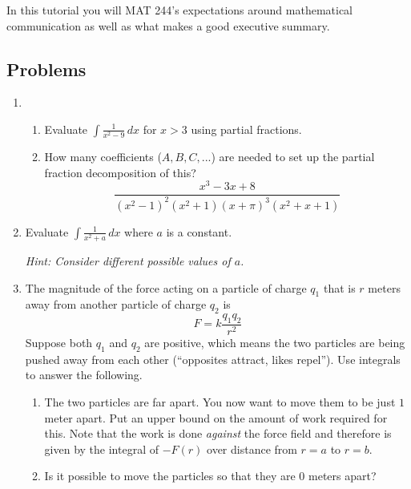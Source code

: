 \begin{objectives}
	In this tutorial you will MAT 244's expectations around mathematical communication as well
	as what makes a good executive summary.
\end{objectives}

\vspace{-.5em}
\subsection*{Problems}
\vspace{-.5em}


\begin{enumerate}
	\item 
	
\begin{enumerate}
    \item Evaluate $\int \frac{1}{x^2 - 9}\,dx$ for $x > 3$ using partial fractions.
    \item How many coefficients ($A,B,C,...$) are needed to set up the partial fraction decomposition of this?
	\[
		\frac{x^3-3x+8}{(x^2-1)^2(x^2+1)(x+\pi)^3(x^2+x+1)}
	\]
\end{enumerate}

\item Evaluate $\displaystyle\int \frac{1}{x^2 + a}\,dx$ where $a$ is a constant.
	
	\textit{Hint: Consider different possible values of $a$.}

\item The magnitude of the force acting on a particle of charge $q_1$ that is $r$ meters away from another particle of charge $q_2$ is
   	\[
	  	F =k\frac{q_1 q_2}{r^2}
   	\]
   	Suppose both $q_1$ and $q_2$ are positive, which means the two particles are being pushed away from each other (``opposites attract, likes repel''). Use integrals to answer the following.
    \begin{enumerate}
        \item The two particles are far apart. You now want to move them to be just $1$ meter apart. Put an upper bound on the amount of work required for this. Note that the work is done \textit{against} the force field and therefore is given by the integral of $-F(r)$ over distance from $r=a$ to $r=b$.%
        \item Is it possible to move the particles so that they are $0$ meters apart?
    \end{enumerate}


\end{enumerate}

